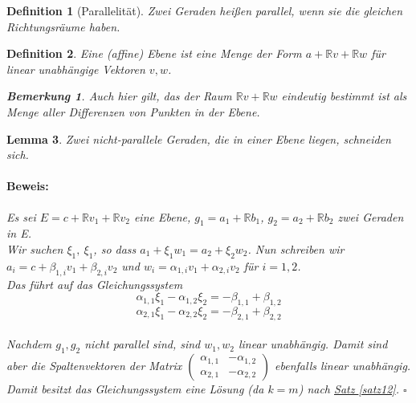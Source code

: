 \documentclass{report}
\newcommand{\R}{\mathbb{R}}
\newcommand{\al}{\alpha}
\theoremstyle{customrem}
\newtheorem*{bem}{Bemerkung}
\theoremstyle{customdef}
\newtheorem{definition}{Definition}[chapter]
\newtheorem{lem}[definition]{Lemma}
\renewenvironment{proof}{\vspace{-.75cm}\paragraph{Beweis: }}{\hfill$\square$}
\begin{document}
	\begin{definition}[Parallelität]
		Zwei Geraden heißen parallel, wenn sie die gleichen Richtungsräume haben.
	\end{definition}

	\begin{definition}
		Eine (affine) Ebene ist eine Menge der Form $a + \R v + \R w$ für linear unabhängige Vektoren $v, w$.
		\begin{bem}
			Auch hier gilt, das der Raum $\R v + \R w$ eindeutig bestimmt ist als Menge aller Differenzen von Punkten in der Ebene.
		\end{bem}
	\end{definition}

	\begin{lem}
		Zwei nicht-parallele Geraden, die in einer Ebene liegen, schneiden sich.\\
		\begin{proof}
			Es sei $E = c + \R v_1 + \R v_2$ eine Ebene, $g_1 = a_1 + \R b_1$, $g_2 = a_2 + \R b_2$ zwei Geraden in E.\\
			Wir suchen $\xi_1,\ \xi_1$, so dass $a_1 + \xi_1 w_1 = a_2 + \xi_2 w_2$. Nun schreiben wir $a_i = c + \beta_{1,i} v_1 + \beta_{2,i} v_2$ und $w_i = \al_{1,i} v_1 + \al_{2,i} v_2$ für $i =1,2$.\\
			Das führt auf das Gleichungssystem\\
			$$
			\al_{1,1} \xi_1 - \al_{1,2} \xi_2 = - \beta_{1,1} + \beta_{1,2}$$$$
			\al_{2,1} \xi_1 - \al_{2,2} \xi_2 = - \beta_{2,1} + \beta_{2,2}
			$$\\
			Nachdem $g_1, g_2$ nicht parallel sind, sind $w_1, w_2$ linear unabhängig. Damit sind aber die Spaltenvektoren der Matrix $
			\begin{pmatrix}
				\al_{1,1} & -\al_{1,2}\\
				\al_{2,1} & -\al_{2,2}
			\end{pmatrix}
			$ ebenfalls linear unabhängig. Damit besitzt das Gleichungssystem eine Lösung (da $k = m$) nach \hyperref[satz12]{Satz \ref{satz12}}.
		\end{proof}
	\end{lem}
\end{document}

